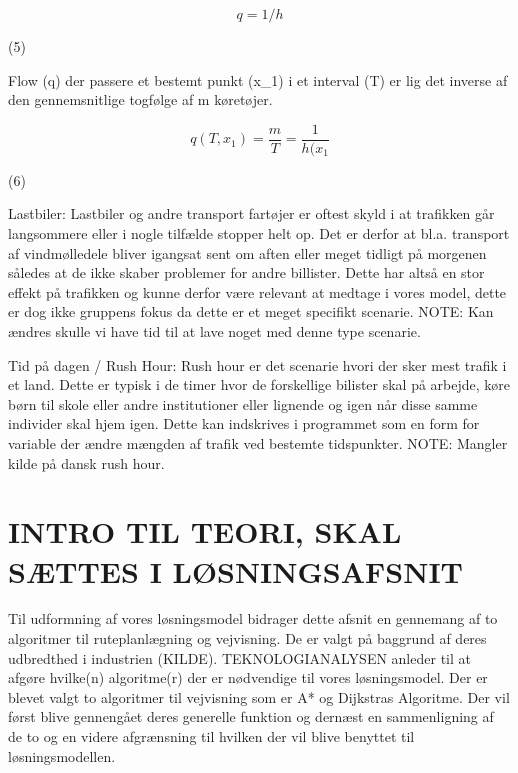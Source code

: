 \[ q = 1/h \]\label{eq:Equation5}\begin{flushright}(5)\end{flushright}

Flow (q) der passere et bestemt punkt (x\_1) i et interval (T) er lig det inverse af den gennemsnitlige togfølge af m køretøjer.

\[ q(T, x_1) = \frac{m}{T} = \frac{1}{h(x_1} \]\label{eq:Equation6}\begin{flushright}(6)\end{flushright}

Lastbiler:
Lastbiler og andre transport fartøjer er oftest skyld i at trafikken går langsommere eller i nogle tilfælde stopper helt op. Det er derfor at bl.a. transport af vindmølledele bliver igangsat sent om aften eller meget tidligt på morgenen således at de ikke skaber problemer for andre billister. Dette har altså en stor effekt på trafikken og kunne derfor være relevant at medtage i vores model, dette er dog ikke gruppens fokus da dette er et meget specifikt scenarie.
NOTE: Kan ændres skulle vi have tid til at lave noget med denne type scenarie.

Tid på dagen / Rush Hour: 
Rush hour er det scenarie hvori der sker mest trafik i et land. Dette er typisk i de timer hvor de forskellige bilister skal på arbejde, køre børn til skole eller andre institutioner eller lignende og igen når disse samme individer skal hjem igen. Dette kan indskrives i programmet som en form for variable der ændre mængden af trafik ved bestemte tidspunkter.
NOTE: Mangler kilde på dansk rush hour.

\section{INTRO TIL TEORI, SKAL SÆTTES I LØSNINGSAFSNIT}
Til udformning af vores løsningsmodel bidrager dette afsnit en gennemang af to algoritmer til ruteplanlægning og vejvisning. De er valgt på baggrund af deres udbredthed i industrien (KILDE). TEKNOLOGIANALYSEN anleder til at afgøre hvilke(n) algoritme(r) der er nødvendige til vores løsningsmodel. Der er blevet valgt to algoritmer til vejvisning som er A* og Dijkstras Algoritme.
Der vil først blive gennengået deres generelle funktion og dernæst en sammenligning af de to og en videre afgrænsning til hvilken der vil blive benyttet til løsningsmodellen.

\vspace{5mm}

